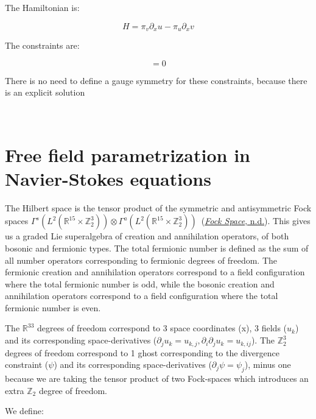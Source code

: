 \documentclass[11pt]{book}
\begin{document}
The Hamiltonian is:

\begin{equation}H=\pi_v \partial_x u-\pi_u \partial_x v\end{equation}

The constraints are:

\begin{equation}[D_x,u+iv]=0\end{equation}

There is no need to define a gauge symmetry for these constraints,
because there is an explicit solution

~

\hypertarget{free-field-parametrization-in-navier-stokes-equations}{%
\section{Free field parametrization in Navier-Stokes
equations}\label{free-field-parametrization-in-navier-stokes-equations}}

\cite{deng_hilberts_2025}

The Hilbert space is the tensor product of the symmetric and
antisymmetric Fock spaces
\(\Gamma^s(L^2(\mathbb{R}^{15}\times \mathbb{Z}_2^{3}))\otimes \Gamma^a(L^2(\mathbb{R}^{15}\times\mathbb{Z}_2^{3})) \)~\cite{Petz:1990gb}(\protect\hyperlink{ref-Fock}{\emph{Fock Space}, n.d.}). This
gives us a graded Lie superalgebra of creation and annihilation
operators, of both bosonic and fermionic types. The total fermionic
number is defined as the sum of all number operators corresponding to
fermionic degrees of freedom. The fermionic creation and annihilation
operators correspond to a field configuration where the total fermionic
number is odd, while the bosonic creation and annihilation operators
correspond to a field configuration where the total fermionic number is
even.

The \(\mathbb{R}^{33}\) degrees of freedom correspond to 3 space
coordinates (x), 3 fields (\(u_{k}\)) and its corresponding
space-derivatives
(\(\partial_{j}u_{k}=u_{k, j}, \partial_{i}\partial_{j}u_{k}=u_{k, i j}\)).
The \(\mathbb{Z}_2^{3}\) degrees of freedom correspond to 1 ghost
corresponding to the divergence constraint (\(\psi\)) and its
corresponding space-derivatives (\(\partial_{j}\psi=\psi_j\)), minus one
because we are taking the tensor product of two Fock-spaces which
introduces an extra \(\mathbb{Z}_2\) degree of freedom.

We define:
\end{document}
